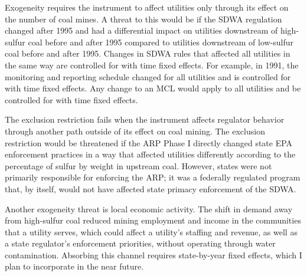 \documentclass[12pt]{article}
\begin{document}
Exogeneity requires the instrument to affect utilities only through its effect on the number of coal mines. A threat to this would be if the SDWA regulation changed after 1995 and had a differential impact on utilities downstream of high-sulfur coal before and after 1995 compared to utilities downstream of low-sulfur coal before and after 1995. Changes in SDWA rules that affected all utilities in the same way are controlled for with time fixed effects. For example, in 1991, the monitoring and reporting schedule changed for all utilities and is controlled for with time fixed effects. Any change to an MCL would apply to all utilities and be controlled for with time fixed effects. 


The exclusion restriction fails when the instrument affects regulator behavior through another path outside of its effect on coal mining. The exclusion restriction would be threatened if the ARP Phase I directly changed state EPA enforcement practices in a way that affected utilities differently according to the percentage of sulfur by weight in upstream coal. However, states were not primarily responsible for enforcing the ARP; it was a federally regulated program that, by itself, would not have affected state primacy enforcement of the SDWA. 

Another exogeneity threat is local economic activity. The shift in demand away from high-sulfur coal reduced mining employment and income in the communities that a utility serves, which could affect a utility's staffing and revenue, as well as a state regulator's enforcement priorities, without operating through water contamination. Absorbing this channel requires state-by-year fixed effects, which I plan to incorporate in the near future.
\end{document}

